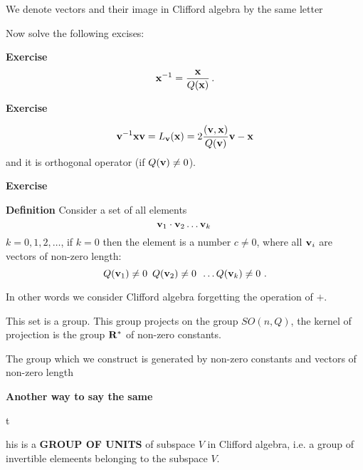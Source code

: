 \smallskip

We denote vectors and their image in Clifford algebra by
the same letter


\bigskip

Now solve the following excises:


  {\bf Exercise} 
      $$
 {\bf x}^{-1}={{\bf x}\over Q({\bf x})}\,.
      $$ 

   {\bf Exercise}

        $$
    {\bf v}^{-1} {\bf x}{\bf v}=L_{\bf v}({\bf x})=2
     {({\bf v},{\bf x})\over Q({\bf v})}{\bf v}-{\bf x}
      $$
and it is orthogonal operator (if $Q({\bf v})\not=0$).


   {\bf Exercise}




{\bf Definition}   Consider a set of all elements
          $$
    {\bf v}_1\cdot{\bf v}_2\dots {\bf v}_k\,
          $$
$k=0,1,2,\dots$, if $k=0$ then the element is a number
$c\not=0$,
where all ${\bf v}_i$ are vectors of non-zero length:
      $$
 Q({\bf v}_1)\not=0\,\,\,
 Q({\bf v}_2)\not=0\,\,\,\dots
 Q({\bf v}_k)\not=0\,\,.
     $$
 
In other words we consider Clifford algebra forgetting 
the operation of $+$.

This set is a group. This group projects on the group
$SO(n, Q)$, the kernel of projection is the group ${\bf R}^*$
of non-zero constants. 

{The group  which we construct is generated by non-zero
constants and vectors of non-zero length }


{\bf Another way to say the same}


\centerline this is  a {\bf GROUP OF UNITS}
   of subspace $V$ in Clifford algebra, i.e. a group of
invertible elemeents belonging to the subspace $V$.

\bye


